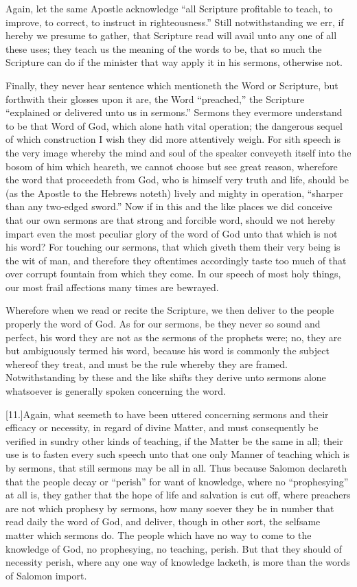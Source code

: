 Again, let the same Apostle acknowledge “all Scripture profitable to teach, to improve, to correct, to instruct in righteousness.” Still notwithstanding we err, if hereby we presume to gather, that Scripture read will avail unto any one of all these uses; they teach us the meaning of the words to be, that so much the Scripture can do if the minister that way apply it in his sermons, otherwise not.

Finally, they never hear sentence which mentioneth the  Word or Scripture, but forthwith their glosses upon it are, the Word “preached,” the Scripture “explained or delivered unto us in sermons.” Sermons they evermore understand to be that Word of God, which alone hath vital operation; the dangerous sequel of which construction I wish they did more attentively weigh. For sith speech is the very image whereby the mind and soul of the speaker conveyeth itself into the bosom of him which heareth, we cannot choose but see great reason, wherefore the word that proceedeth from God, who is himself very truth and life, should be (as the Apostle to the Hebrews noteth) lively and mighty in operation, “sharper than any two-edged sword.” Now if in this and the like places we did conceive that our own sermons are that strong and forcible word, should we not hereby impart even the most peculiar glory of the word of God unto that which is not his word? For touching our sermons, that which giveth them their very being is the wit of man, and therefore  they oftentimes accordingly taste too much of that over corrupt fountain from which they come.
 In our speech of most holy things, our most frail affections many times are bewrayed.

Wherefore when we read or recite the Scripture, we then deliver to the people properly the word of God. As for our sermons, be they never so sound and perfect, his word they are not as the sermons of the prophets were; no, they are but ambiguously termed his word, because his word is commonly the subject whereof they treat, and must be the rule whereby they are framed. Notwithstanding by these and the like shifts they derive unto sermons alone whatsoever is generally spoken concerning the word.

[11.]Again, what seemeth to have been uttered concerning sermons and their efficacy or necessity, in regard of divine Matter, and must consequently be verified in sundry other kinds of teaching, if the Matter be the same in all; their use is to fasten every such speech unto that one only Manner of teaching which is by sermons, that still sermons may be all in all. Thus because Salomon declareth that the people decay or “perish” for want of knowledge, where no “prophesying” at all is, they gather that the hope of life and salvation is cut off, where preachers are not which prophesy by sermons, how many soever they be in number that read daily the word of God, and deliver, though in other sort, the selfsame matter which sermons do. The people which have  no way to come to the knowledge of God, no prophesying, no teaching, perish.
 But that they should of necessity perish, where any one way of knowledge lacketh, is more than the words of Salomon import.

